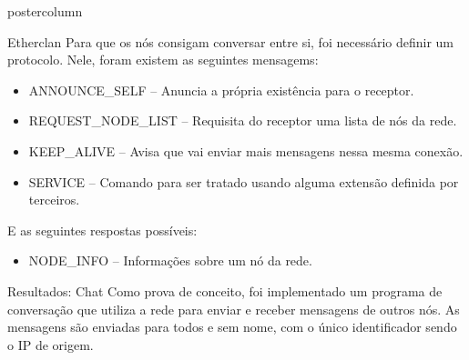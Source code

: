 \documentclass[final]{beamer}
\begin{document}
\begin{frame}
\begin{columns}
\begin{column}{.5\textwidth}
\begin{beamercolorbox}[center,wd=\textwidth]{postercolumn}
\begin{minipage}[T]{.95\textwidth}
{\begin{block}{Etherclan}
                \vspace*{0.5cm}
                Para que os nós consigam conversar entre si, foi necessário definir um protocolo. 
                Nele, foram existem as seguintes mensagems:
                \begin{itemize}
                  \item ANNOUNCE\_SELF -- Anuncia a própria existência para o receptor.
                  \item REQUEST\_NODE\_LIST -- Requisita do receptor uma lista de nós da rede.
                  \item KEEP\_ALIVE -- Avisa que vai enviar mais mensagens nessa mesma conexão.
                  \item SERVICE -- Comando para ser tratado usando alguma extensão definida por terceiros.
                \end{itemize}
                
                \vspace*{0.2cm}
                
                E as seguintes respostas possíveis:
                \begin{itemize}
                  \item NODE\_INFO -- Informações sobre um nó da rede.
                \end{itemize}
                
                \vspace*{0.2cm} 
            \end{block}

            \vspace*{0.2cm} 
            
            \begin{block}{Resultados: Chat}
              \justifying 
                Como prova de conceito, foi implementado um programa de conversação que utiliza a rede para enviar e receber
                mensagens de outros nós. As mensagens são enviadas para todos e sem nome, com o único identificador sendo o IP
                de origem.
                

\end{block}}
\end{minipage}
\end{beamercolorbox}
\end{column}
\end{columns}
\end{frame}
\end{document}
